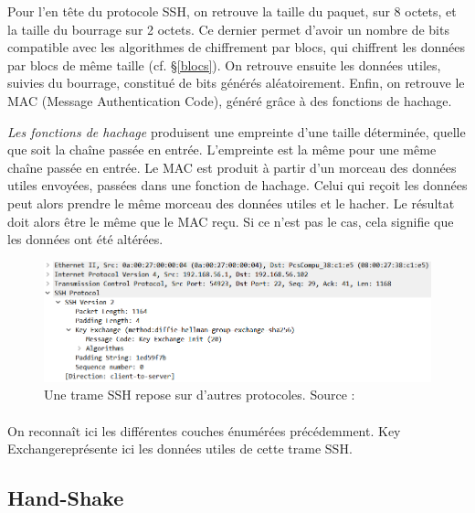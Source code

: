Pour l'en tête du protocole SSH, on retrouve la taille du paquet, sur 8 octets, et la taille du bourrage sur 2 octets. Ce dernier permet d'avoir un nombre de bits compatible avec les algorithmes de chiffrement par blocs, qui chiffrent les données par blocs de même taille (cf. §\ref{blocs}).
On retrouve ensuite les données utiles, suivies du bourrage, constitué de bits générés aléatoirement. Enfin, on retrouve le MAC (Message Authentication Code), généré grâce à des fonctions de hachage. \cite{cadegros_etude_2023, hajjeh_ibrahim_protocole_2006}

\begin{leftbar}
    \emph{Les fonctions de hachage} produisent une empreinte d'une taille déterminée, quelle que soit la chaîne passée en entrée. L'empreinte est la même pour une même chaîne passée en entrée. Le MAC est produit à partir d'un morceau des données utiles envoyées, passées dans une fonction de hachage. Celui qui reçoit les données peut alors prendre le même morceau des données utiles et le hacher. Le résultat doit alors être le même que le MAC reçu. Si ce n'est pas le cas, cela signifie que les données ont été altérées. \cite{hajjeh_ibrahim_protocole_2006}
\end{leftbar}

\begin{figure}[H]
    \includegraphics[scale=0.85]{images/Constitution_trames.png}
    \caption{Une trame SSH repose sur d'autres protocoles. Source : \cite{cadegros_etude_2023}}
\end{figure}

\paragraph{}
On reconnaît ici les différentes couches énumérées précédemment. \og Key Exchange\fg représente ici les données utiles de cette trame SSH.

\subsection{Hand-Shake} \label{handshake}

